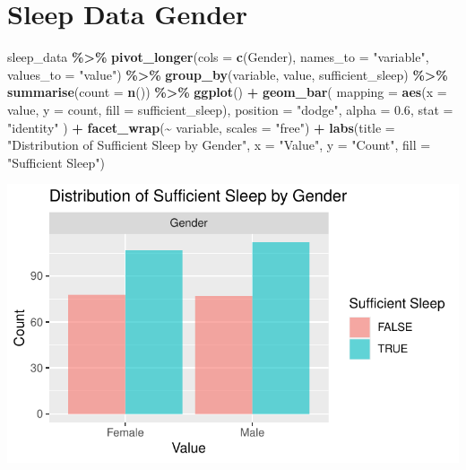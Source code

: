 \documentclass[
  11pt,
]{article}
\newenvironment{Shaded}{\begin{snugshade}}{\end{snugshade}}
\newcommand{\AttributeTok}[1]{\textcolor[rgb]{0.13,0.29,0.53}{#1}}
\newcommand{\FloatTok}[1]{\textcolor[rgb]{0.00,0.00,0.81}{#1}}
\newcommand{\FunctionTok}[1]{\textcolor[rgb]{0.13,0.29,0.53}{\textbf{#1}}}
\newcommand{\NormalTok}[1]{#1}
\newcommand{\SpecialCharTok}[1]{\textcolor[rgb]{0.81,0.36,0.00}{\textbf{#1}}}
\newcommand{\StringTok}[1]{\textcolor[rgb]{0.31,0.60,0.02}{#1}}
\begin{document}
\hypertarget{sleep-data-gender}{%
\section{Sleep Data Gender}\label{sleep-data-gender}}

\begin{Shaded}
\begin{Highlighting}[]
\NormalTok{sleep\_data }\SpecialCharTok{\%\textgreater{}\%}
  \FunctionTok{pivot\_longer}\NormalTok{(}\AttributeTok{cols =} \FunctionTok{c}\NormalTok{(Gender), }\AttributeTok{names\_to =} \StringTok{"variable"}\NormalTok{, }\AttributeTok{values\_to =} \StringTok{"value"}\NormalTok{) }\SpecialCharTok{\%\textgreater{}\%}
  \FunctionTok{group\_by}\NormalTok{(variable, value, sufficient\_sleep) }\SpecialCharTok{\%\textgreater{}\%}
  \FunctionTok{summarise}\NormalTok{(}\AttributeTok{count =} \FunctionTok{n}\NormalTok{()) }\SpecialCharTok{\%\textgreater{}\%}
  \FunctionTok{ggplot}\NormalTok{() }\SpecialCharTok{+}
  \FunctionTok{geom\_bar}\NormalTok{(}
    \AttributeTok{mapping =} \FunctionTok{aes}\NormalTok{(}\AttributeTok{x =}\NormalTok{ value, }\AttributeTok{y =}\NormalTok{ count, }\AttributeTok{fill =}\NormalTok{ sufficient\_sleep),}
    \AttributeTok{position =} \StringTok{"dodge"}\NormalTok{,  }
    \AttributeTok{alpha =} \FloatTok{0.6}\NormalTok{,}
    \AttributeTok{stat =} \StringTok{"identity"}
\NormalTok{  ) }\SpecialCharTok{+}
  \FunctionTok{facet\_wrap}\NormalTok{(}\SpecialCharTok{\textasciitilde{}}\NormalTok{ variable, }\AttributeTok{scales =} \StringTok{"free"}\NormalTok{) }\SpecialCharTok{+}
  \FunctionTok{labs}\NormalTok{(}\AttributeTok{title =} \StringTok{"Distribution of Sufficient Sleep by Gender"}\NormalTok{,}
       \AttributeTok{x =} \StringTok{"Value"}\NormalTok{, }
       \AttributeTok{y =} \StringTok{"Count"}\NormalTok{, }
       \AttributeTok{fill =} \StringTok{"Sufficient Sleep"}\NormalTok{)}
\end{Highlighting}
\end{Shaded}

\begin{center}\includegraphics[width=0.7\linewidth]{SleepHelath_files/figure-latex/unnamed-chunk-36-1} \end{center}
\end{document}
